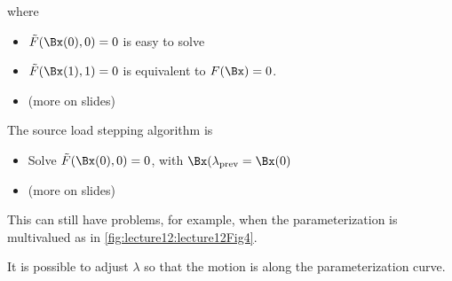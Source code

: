 where

\begin{itemize}
\item \( \tilde{F}(\Bx(0), 0) = 0 \) is easy to solve
\item \( \tilde{F}(\Bx(1), 1) = 0 \) is equivalent to \( F(\Bx) = 0 \).
\item (more on slides)
\end{itemize}

The source load stepping algorithm is

\begin{itemize}
\item Solve \(\tilde{F}(\Bx(0), 0) = 0 \), with \( \Bx(\lambda_{\text{prev}} = \Bx(0) \)
\item (more on slides)
\end{itemize}

This can still have problems, for example, when the parameterization is multivalued as in \cref{fig:lecture12:lecture12Fig4}.


It is possible to adjust \( \lambda \) so that the motion is along the parameterization curve.

